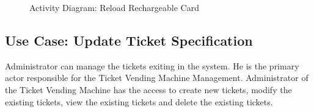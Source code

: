 \documentclass[a4paper,12pt]{report}
\begin{document}
\begin{figure}[!htbp]
	\centering
	\caption{\label{fig:act_reload_rechargable_card}Activity Diagram: Reload Rechargeable Card}	
\end{figure}


\FloatBarrier
\subsection{Use Case: Update Ticket Specification}
Administrator can manage the tickets exiting in the system. He is the primary actor responsible for the Ticket Vending Machine Management. Administrator of the Ticket Vending Machine has the access to create new tickets, modify the existing tickets, view the existing tickets and delete the existing tickets. \\ 
\end{document}
